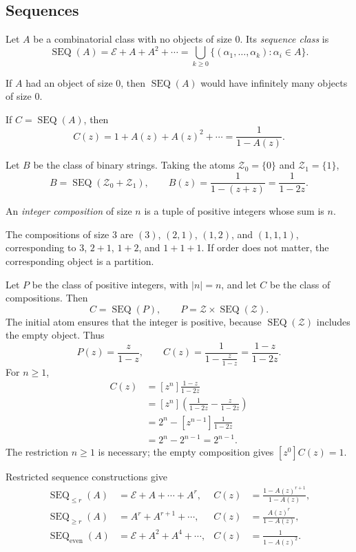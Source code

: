 \subsection{Sequences}
\begin{definition}
Let $A$ be a combinatorial class with no objects of size $0$. Its \textit{sequence class} is
\[
\operatorname{SEQ}(A)=\mathcal E+A+A^2+\cdots
=\bigcup_{k\ge0}\{(\alpha_1,\ldots,\alpha_k):\alpha_i\in A\}.
\]
\end{definition}
If $A$ had an object of size $0$, then $\operatorname{SEQ}(A)$ would have infinitely many objects of size $0$.
\begin{lemma}
If $C=\operatorname{SEQ}(A)$, then
\[
C(z)=1+A(z)+A(z)^2+\cdots=\frac1{1-A(z)}.
\]
\end{lemma}
\begin{example}
Let $B$ be the class of binary strings. Taking the atoms $\mathcal Z_0=\{0\}$ and $\mathcal Z_1=\{1\}$,
\[
B=\operatorname{SEQ}(\mathcal Z_0+\mathcal Z_1),
\qquad B(z)=\frac1{1-(z+z)}=\frac1{1-2z}.
\]
\end{example}
\begin{definition}
An \textit{integer composition} of size $n$ is a tuple of positive integers whose sum is $n$.
\end{definition}
\begin{example}
The compositions of size $3$ are $(3)$, $(2,1)$, $(1,2)$, and $(1,1,1)$, corresponding to
$3$, $2+1$, $1+2$, and $1+1+1$.
If order does not matter, the corresponding object is a partition.

Let $P$ be the class of positive integers, with $|n|=n$, and let $C$ be the class of compositions. Then
\[
C=\operatorname{SEQ}(P),\qquad
P=\mathcal Z\times\operatorname{SEQ}(\mathcal Z).
\]
The initial atom ensures that the integer is positive, because $\operatorname{SEQ}(\mathcal Z)$ includes the empty object. Thus
\[
P(z)=\frac z{1-z},\qquad
C(z)=\frac1{1-\frac z{1-z}}=\frac{1-z}{1-2z}.
\]
For $n\ge1$,
\begin{align*}
[z^n]C(z)&=[z^n]\frac{1-z}{1-2z}\\
&=[z^n]\left(\frac1{1-2z}-\frac z{1-2z}\right)\\
&=2^n-[z^{n-1}]\frac1{1-2z}\\
&=2^n-2^{n-1}=2^{n-1}.
\end{align*}
The restriction $n\ge1$ is necessary; the empty composition gives $[z^0]C(z)=1$.
\end{example}

Restricted sequence constructions give
\begin{align*}
\operatorname{SEQ}_{\le r}(A)&=\mathcal E+A+\cdots+A^r,
& C(z)&=\frac{1-A(z)^{r+1}}{1-A(z)},\\
\operatorname{SEQ}_{\ge r}(A)&=A^r+A^{r+1}+\cdots,
& C(z)&=\frac{A(z)^r}{1-A(z)},\\
\operatorname{SEQ}_{\mathrm{even}}(A)&=\mathcal E+A^2+A^4+\cdots,
& C(z)&=\frac1{1-A(z)^2}.
\end{align*}

